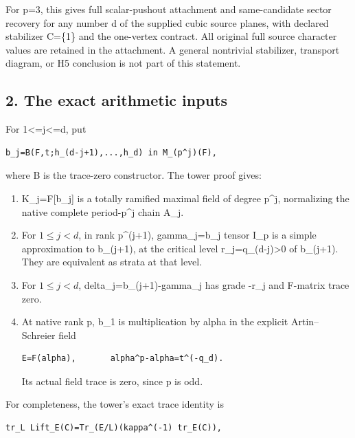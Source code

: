 For p=3, this gives full scalar-pushout attachment and same-candidate
sector recovery for any number d of the supplied cubic source planes,
with declared stabilizer C=\{1\} and the one-vertex contract. All
original full source character values are retained in the attachment. A
general nontrivial stabilizer, transport diagram, or H5 conclusion is
not part of this statement.

\hypertarget{odd_character-the-exact-arithmetic-inputs}{%
\subsection{2. The exact arithmetic
inputs}\label{odd_character-the-exact-arithmetic-inputs}}

For 1\textless=j\textless=d, put

\begin{Verbatim}[fontsize=\small,breaklines=true,breakanywhere=true]
b_j=B(F,t;h_(d-j+1),...,h_d) in M_(p^j)(F),
\end{Verbatim}

where B is the trace-zero constructor. The tower proof gives:

\begin{enumerate}
\def\labelenumi{\arabic{enumi}.}
\item
  K\_j=F{[}b\_j{]} is a totally ramified maximal field of degree p\^{}j,
  normalizing the native complete period-p\^{}j chain A\_j.
\item
  For \(1\le j<d\), in rank p\^{}(j+1), gamma\_j=b\_j tensor I\_p is a simple
  approximation to b\_(j+1), at the critical level
  r\_j=q\_(d-j)\textgreater0 of b\_(j+1). They are equivalent as strata
  at that level.
\item
  For \(1\le j<d\), delta\_j=b\_(j+1)-gamma\_j has grade -r\_j and F-matrix trace zero.
\item
  At native rank p, b\_1 is multiplication by alpha in the explicit
  Artin--Schreier field

\begin{Verbatim}[fontsize=\small,breaklines=true,breakanywhere=true]
E=F(alpha),       alpha^p-alpha=t^(-q_d).
\end{Verbatim}

  Its actual field trace is zero, since p is odd.
\end{enumerate}

For completeness, the tower's exact trace identity is

\begin{Verbatim}[fontsize=\small,breaklines=true,breakanywhere=true]
tr_L Lift_E(C)=Tr_(E/L)(kappa^(-1) tr_E(C)),
\end{Verbatim}

